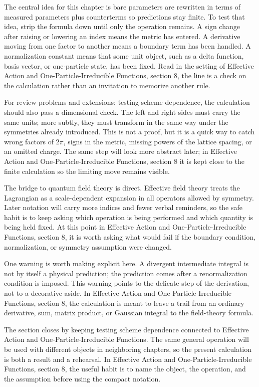 The central idea for this chapter is bare parameters are rewritten in terms of measured parameters plus counterterms so predictions stay finite.  To test that idea, strip the formula down until only the operation remains.  A sign change after raising or lowering an index means the metric has entered.  A derivative moving from one factor to another means a boundary term has been handled.  A normalization constant means that some unit object, such as a delta function, basis vector, or one-particle state, has been fixed.  Read in the setting of Effective Action and One-Particle-Irreducible Functions, section 8, the line is a check on the calculation rather than an invitation to memorize another rule.

For review problems and extensions: testing scheme dependence, the calculation should also pass a dimensional check.  The left and right sides must carry the same units; more subtly, they must transform in the same way under the symmetries already introduced.  This is not a proof, but it is a quick way to catch wrong factors of \(2\pi\), signs in the metric, missing powers of the lattice spacing, or an omitted charge.  The same step will look more abstract later; in Effective Action and One-Particle-Irreducible Functions, section 8 it is kept close to the finite calculation so the limiting move remains visible.

The bridge to quantum field theory is direct.  Effective field theory treats the Lagrangian as a scale-dependent expansion in all operators allowed by symmetry.  Later notation will carry more indices and fewer verbal reminders, so the safe habit is to keep asking which operation is being performed and which quantity is being held fixed.  At this point in Effective Action and One-Particle-Irreducible Functions, section 8, it is worth asking what would fail if the boundary condition, normalization, or symmetry assumption were changed.

One warning is worth making explicit here.  A divergent intermediate integral is not by itself a physical prediction; the prediction comes after a renormalization condition is imposed.  This warning points to the delicate step of the derivation, not to a decorative aside.  In Effective Action and One-Particle-Irreducible Functions, section 8, the calculation is meant to leave a trail from an ordinary derivative, sum, matrix product, or Gaussian integral to the field-theory formula.

The section closes by keeping testing scheme dependence connected to Effective Action and One-Particle-Irreducible Functions.  The same general operation will be used with different objects in neighboring chapters, so the present calculation is both a result and a rehearsal.  In Effective Action and One-Particle-Irreducible Functions, section 8, the useful habit is to name the object, the operation, and the assumption before using the compact notation.



